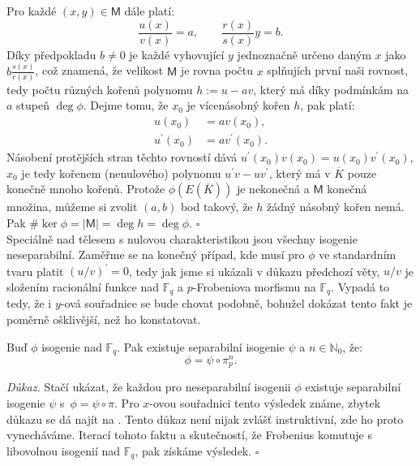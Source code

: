 \documentclass[12pt]{report}
\begin{document}
Pro každé $(x,y) \in \mathsf{M}$ dále platí:
\begin{equation*}
\frac{u(x)}{v(x)} = a, \qquad \frac{r(x)}{s(x)}y = b.
\end{equation*}
Díky předpokladu $b \neq 0$ je každé vyhovující $y$ jednoznačně určeno daným $x$ jako $b \frac{s(x)}{r(x)}$, což znamená, že velikost $\mathsf{M}$ je rovna počtu $x$ splňujích první naši rovnost, tedy počtu různých kořenů polynomu $h:= u - av$, který má díky podmínkám na $a$ stupeň $\deg \phi$. Dejme tomu, že $x_0$ je vícenásobný kořen $h$, pak platí:
\begin{align*}
u(x_0) &= a v(x_0),\\
u^{\prime} (x_0)  &=  a v^{\prime} (x_0).
\end{align*}  
Násobení protějších stran těchto rovností dává $u^{\prime} (x_0) v (x_0) = u (x_0) v^{\prime} (x_0)$, $x_0$ je tedy kořenem (nenulového) polynomu $u^\prime v - u v^\prime$, který má v $\overline{K}$ pouze konečně mnoho kořenů. Protože $\phi(E(\overline{K}))$ je nekonečná a $\mathsf{M}$ konečná množina, můžeme si zvolit $(a,b)$ bod takový, že $h$ žádný násobný kořen nemá. Pak $\# \ker \phi = \vert \mathsf{M}\vert = \deg h = \deg \phi$. \hfill $\square$\\

Speciálně nad tělesem s nulovou charakteristikou jsou všechny isogenie neseparabilní. Zaměřme se na konečný případ, kde musí pro $\phi$ ve standardním tvaru platit $(u/v)^\prime =0$, tedy jak jsme si ukázali v důkazu předchozí věty, $u/v$ je složením racionální funkce nad $\mathbb{F}_q$ a $p$-Frobeniova morfismu na $\mathbb{F}_q$. Vypadá to tedy, že i $y$-ová souřadnice se bude chovat podobně, bohužel dokázat tento fakt je poměrně ošklivější, než ho konstatovat. 

\begin{dusledek}\label{separ2}
Buď $\phi$ isogenie nad $\mathbb{F}_q$. Pak existuje separabilní isogenie $\psi$ a $n \in \mathbb{N}_0$, že:
\begin{equation*}
\phi = \psi \circ \pi_p ^n.
\end{equation*}
\end{dusledek}

\noindent \textit{Důkaz.} Stačí ukázat, že každou pro neseparabilní isogenii $\phi$ existuje separabilní isogenie $\psi$ s~$\phi = \psi \circ \pi$. Pro $x$-ovou souřadnici tento výsledek známe, zbytek důkazu se dá najít na \cite[Lemma 6.3.]{Sutherland}. Tento důkaz není nijak zvlášť instruktivní, zde ho proto vynecháváme. Iterací tohoto faktu a skutečností, že Frobenius komutuje s libovolnou isogenií nad $\mathbb{F}_q$, pak získáme výsledek. \hfill $\square$\\
\end{document}
